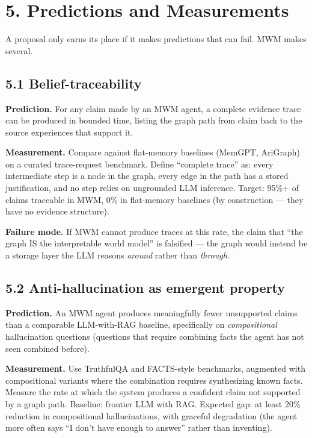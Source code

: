 \documentclass[12pt]{article}
\begin{document}
\section{5. Predictions and Measurements}\label{predictions-and-measurements}

A proposal only earns its place if it makes predictions that can fail. MWM makes several.

\subsection{5.1 Belief-traceability}\label{belief-traceability}

\textbf{Prediction.} For any claim made by an MWM agent, a complete evidence trace can be produced in bounded time, listing the graph path from claim back to the source experiences that support it.

\textbf{Measurement.} Compare against flat-memory baselines (MemGPT, AriGraph) on a curated trace-request benchmark. Define ``complete trace'' as: every intermediate step is a node in the graph, every edge in the path has a stored justification, and no step relies on ungrounded LLM inference. Target: 95\%+ of claims traceable in MWM, 0\% in flat-memory baselines (by construction --- they have no evidence structure).

\textbf{Failure mode.} If MWM cannot produce traces at this rate, the claim that ``the graph IS the interpretable world model'' is falsified --- the graph would instead be a storage layer the LLM reasons \emph{around} rather than \emph{through}.

\subsection{5.2 Anti-hallucination as emergent property}\label{anti-hallucination-as-emergent-property}

\textbf{Prediction.} An MWM agent produces meaningfully fewer unsupported claims than a comparable LLM-with-RAG baseline, specifically on \emph{compositional} hallucination questions (questions that require combining facts the agent has not seen combined before).

\textbf{Measurement.} Use TruthfulQA and FACTS-style benchmarks, augmented with compositional variants where the combination requires synthesizing known facts. Measure the rate at which the system produces a confident claim not supported by a graph path. Baseline: frontier LLM with RAG. Expected gap: at least 20\% reduction in compositional hallucinations, with graceful degradation (the agent more often says ``I don't have enough to answer'' rather than inventing).
\end{document}
